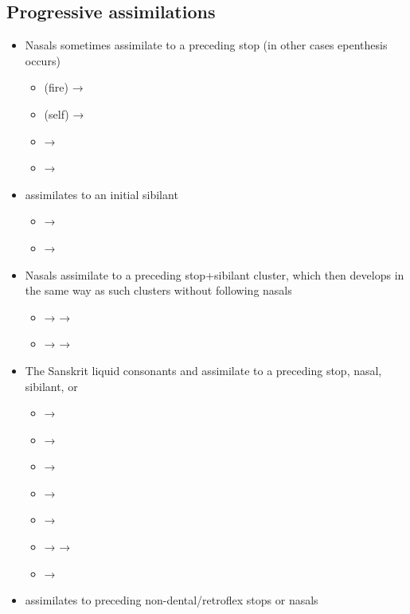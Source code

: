\subsection*{Progressive assimilations}

\begin{itemize}
	\item Nasals sometimes assimilate to a preceding stop (in other cases epenthesis occurs)
		\begin{itemize}
			\item {} (fire) → 
			\item {} (self) → 
			\item {} → 
			\item {} → 
		\end{itemize}
	\item {} assimilates to an initial sibilant
		\begin{itemize}
			\item {} → 
			\item {} → 
		\end{itemize}
	\item Nasals assimilate to a preceding stop+sibilant cluster, which then develops in the same way as such clusters without following nasals
		\begin{itemize}
			\item {} →  → 
			\item {} →  → 
		\end{itemize}
	\item The Sanskrit liquid consonants  and  assimilate to a preceding stop, nasal, sibilant, or 
		\begin{itemize}
			\item {} → 
			\item {} → 
			\item {} → 
			\item {} → 
			\item {} → 
			\item {} →  → 
			\item {} → 
		\end{itemize}
	\item {} assimilates to preceding non-dental/retroflex stops or nasals

\end{itemize}
